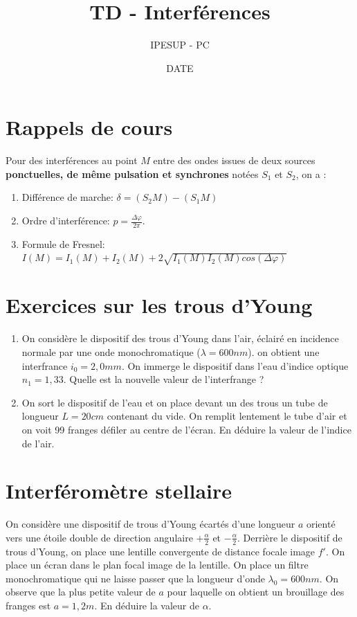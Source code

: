 \documentclass{article}
\title{TD - Interférences }
\author{IPESUP - PC }
\date{DATE}
\begin{document}
\maketitle



\section{Rappels de cours}

Pour des interférences au point $M$ entre des ondes issues de deux sources \textbf{ponctuelles, de même pulsation et synchrones} notées $S_1$ et $S_2$, on a : \\
\begin{enumerate}
  \item Différence de marche: $\delta = (S_2M) - (S_1M)$
  \item Ordre d'interférence: $p=\frac{\Delta \varphi }{2 \pi}$. 
  \item Formule de Fresnel: $I(M) = I_1(M) + I_2(M) + 2 \sqrt{I_1(M) I_2(M) cos (\Delta \varphi)}$
\end{enumerate}



\section{Exercices sur les trous d'Young}

\begin{enumerate}
  \item On considère le dispositif des trous d'Young dans l'air, éclairé en incidence normale par une onde monochromatique ($\lambda =600 nm$).  on obtient une interfrance $i_0 = 2,0mm$.  On immerge le dispositif dans l'eau d'indice optique $n_1 = 1,33$.   Quelle est la nouvelle valeur de l'interfrange ? 
  \item On sort le dispositif de l'eau et on place devant un des trous un tube de longueur $L=20cm$ contenant du vide. On remplit lentement le tube d'air et on voit 99 franges défiler au centre de l'écran. En déduire la valeur de l'indice de l'air.  
\end{enumerate}

\section{Interféromètre stellaire}
On considère une dispositif de trous d'Young écartés d'une longueur $a$ orienté vers une étoile double de direction angulaire $+ \frac{\alpha}{2}$ et $- \frac{ \alpha}{2}$. 
Derrière le dispositif de trous d'Young, on place une lentille convergente de distance focale image $f'$. 
On place un écran dans le plan focal image de la lentille. 
On place un filtre monochromatique qui ne laisse passer que la longueur d'onde $\lambda_0 = 600nm.$
On observe que la plus petite valeur de $a$ pour laquelle on obtient un brouillage des franges est $a=1,2m$. 
En déduire la valeur de $\alpha$. 
\end{document}

